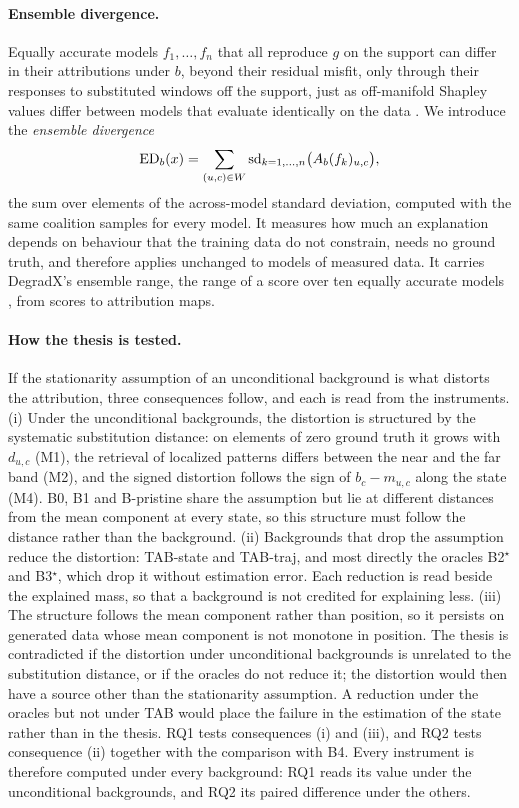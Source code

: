 \documentclass{article}
\begin{document}
\paragraph{Ensemble divergence.} Equally accurate models $f_1,\dots,f_n$ that all reproduce $g$ on the support can differ in their attributions under $b$, beyond their residual misfit, only through their responses to substituted windows off the support, just as off-manifold Shapley values differ between models that evaluate identically on the data \citep{frye2021shapley}. We introduce the \emph{ensemble divergence}
\begin{equation}\label{eq:ed}
\mathrm{ED}_b(x) = \sum_{(u,c)\in W} \operatorname{sd}_{k=1,\dots,n}\bigl(A_b(f_k)_{u,c}\bigr),
\end{equation}
the sum over elements of the across-model standard deviation, computed with the same coalition samples for every model. It measures how much an explanation depends on behaviour that the training data do not constrain, needs no ground truth, and therefore applies unchanged to models of measured data. It carries DegradX's ensemble range, the range of a score over ten equally accurate models \citep{degradx2026}, from scores to attribution maps.

\paragraph{How the thesis is tested.} If the stationarity assumption of an unconditional background is what distorts the attribution, three consequences follow, and each is read from the instruments. (i) Under the unconditional backgrounds, the distortion is structured by the systematic substitution distance: on elements of zero ground truth it grows with $d_{u,c}$ (M1), the retrieval of localized patterns differs between the near and the far band (M2), and the signed distortion follows the sign of $b_c-m_{u,c}$ along the state (M4). B0, B1 and B-pristine share the assumption but lie at different distances from the mean component at every state, so this structure must follow the distance rather than the background. (ii) Backgrounds that drop the assumption reduce the distortion: TAB-state and TAB-traj, and most directly the oracles B2$^\star$ and B3$^\star$, which drop it without estimation error. Each reduction is read beside the explained mass, so that a background is not credited for explaining less. (iii) The structure follows the mean component rather than position, so it persists on generated data whose mean component is not monotone in position. The thesis is contradicted if the distortion under unconditional backgrounds is unrelated to the substitution distance, or if the oracles do not reduce it; the distortion would then have a source other than the stationarity assumption. A reduction under the oracles but not under TAB would place the failure in the estimation of the state rather than in the thesis. RQ1 tests consequences (i) and (iii), and RQ2 tests consequence (ii) together with the comparison with B4. Every instrument is therefore computed under every background: RQ1 reads its value under the unconditional backgrounds, and RQ2 its paired difference under the others.
\end{document}
